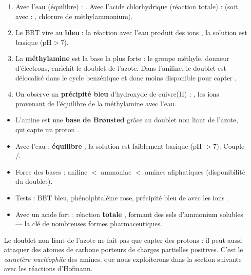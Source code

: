 \documentclass[11pt]{article}
\begin{document}
\begin{corrige}[Exercice 1]
\begin{enumerate}
  \item Avec l'eau (équilibre) : . Avec l'acide chlorhydrique (réaction totale) :  (soit, avec  : , chlorure de méthylammonium).
  \item Le BBT vire au \textbf{bleu} : la réaction avec l'eau produit des ions , la solution est basique ($\mathrm{pH} > 7$).
  \item La \textbf{méthylamine} est la base la plus forte : le groupe méthyle, donneur d'électrons, enrichit le doublet de l'azote. Dans l'aniline, le doublet est délocalisé dans le cycle benzénique et donc moins disponible pour capter .
  \item On observe un \textbf{précipité bleu} d'hydroxyde de cuivre(II) : , les ions  provenant de l'équilibre de la méthylamine avec l'eau.
\end{enumerate}
\end{corrige}

\begin{aretenir}
\begin{itemize}
  \item L'amine est une \textbf{base de Brønsted} grâce au doublet non liant de l'azote, qui capte un proton .
  \item Avec l'eau : \textbf{équilibre}  ; la solution est faiblement basique (pH $> 7$). Couple /.
  \item Force des bases : aniline $<$ ammoniac $<$ amines aliphatiques (disponibilité du doublet).
  \item Tests : BBT bleu, phénolphtaléine rose, précipité bleu de  avec les ions .
  \item Avec un acide fort : réaction \textbf{totale} , formant des sels d'ammonium solubles — la clé de nombreuses formes pharmaceutiques.
\end{itemize}
\end{aretenir}

Le doublet non liant de l'azote ne fait pas que capter des protons : il peut aussi attaquer des atomes de carbone porteurs de charges partielles positives. C'est le \emph{caractère nucléophile} des amines, que nous exploiterons dans la section suivante avec les réactions d'Hofmann.
\end{document}
